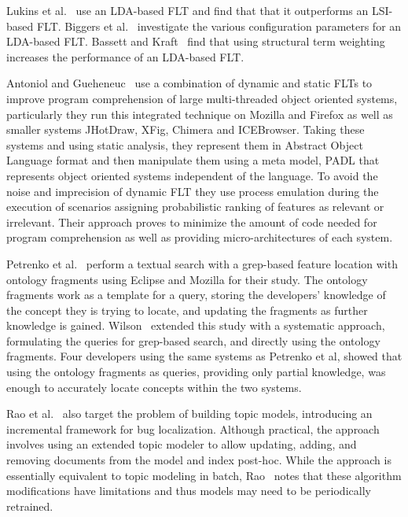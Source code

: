 Lukins et al.~\cite{Lukins-etal:2008} use an LDA-based FLT and
find that that it outperforms an LSI-based FLT.
Biggers et al.~\cite{Biggers-etal:2014} investigate the various configuration
parameters for an LDA-based FLT.
Bassett and Kraft~\cite{Bassett-Kraft:2013} find that using structural
term weighting increases the performance of an LDA-based FLT.

Antoniol and Gueheneuc~\cite{Antoniol-Gueheneuc:2005, Antoniol-Gueheneuc:2006} use a combination of dynamic and
static FLTs to improve program comprehension of large multi-threaded
object oriented systems, particularly they run this integrated technique on
Mozilla and Firefox as well as smaller systems JHotDraw, XFig, Chimera and
ICEBrowser. Taking these systems and using static analysis, they represent them
in Abstract Object Language format and then manipulate them using a meta model,
PADL that represents object oriented systems independent of the language. To
avoid the noise and imprecision of dynamic FLT they use process emulation
during the execution of scenarios assigning probabilistic ranking of features as
relevant or irrelevant. Their approach proves to minimize the amount of code
needed for program comprehension as well as providing micro-architectures of
each system.

Petrenko et al.~\cite{Petrenko-etal:2008} perform a textual search with a grep-based
feature location with ontology fragments using Eclipse and Mozilla for their
study. The ontology fragments work as a template for a query, storing the
developers' knowledge of the concept they is trying to locate, and updating the
fragments as further knowledge is gained. Wilson~\cite{Wilson:2010} extended this
study with a systematic approach, formulating the queries for grep-based search, and
directly using the ontology fragments. Four developers using the same systems
as Petrenko et al, showed that using the ontology fragments as queries, providing
only partial knowledge, was enough to accurately locate concepts within the
two systems.

Rao et al.~\cite{Rao-etal:2013} also target the problem of building
topic models, introducing an incremental framework for bug localization.
Although practical, the approach involves using an extended topic modeler to allow
updating, adding, and removing documents from the model and index post-hoc.
While the approach is essentially equivalent to topic modeling in batch,
Rao~\cite{Rao:2013} notes that these algorithm modifications have limitations and
thus models may need to be periodically retrained.
